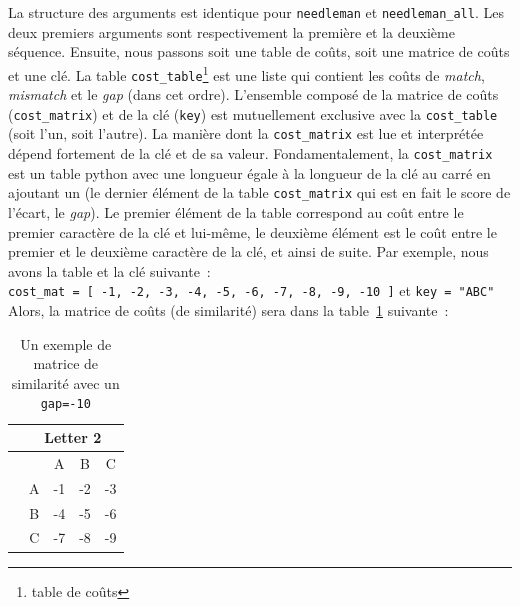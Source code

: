\documentclass[12pt]{article}
\def\rot#1{\rotatebox{90}{#1}}
\begin{document}
La structure des arguments est identique pour \texttt{needleman} et \texttt{needleman\_all}. Les deux premiers arguments sont respectivement la première et la deuxième séquence. Ensuite, nous passons soit une table de coûts, soit une matrice de coûts et une clé. La table \texttt{cost\_table}\footnote{table de coûts} est une liste qui contient les coûts de \textit{match}, \textit{mismatch} et le \textit{gap} (dans cet ordre). L'ensemble composé de la matrice de coûts (\texttt{cost\_matrix}) et de la clé (\texttt{key}) est mutuellement exclusive avec la \texttt{cost\_table} (soit l'un, soit l'autre). La manière dont la \texttt{cost\_matrix} est lue et interprétée dépend fortement de la clé et de sa valeur. Fondamentalement, la \texttt{cost\_matrix} est un table python avec une longueur égale à la longueur de la clé au carré en ajoutant un (le dernier élément de la table \texttt{cost\_matrix} qui est en fait le score de l'écart, le \textit{gap}). Le premier élément de la table correspond au coût entre le premier caractère de la clé et lui-même, le deuxième élément est le coût entre le premier et le deuxième caractère de la clé, et ainsi de suite. Par exemple, nous avons la table et la clé suivante~:\\ \texttt{cost\_mat = [  -1, -2, -3, -4, -5, -6, -7, -8, -9, -10  ]} 
et \texttt{key = "ABC"}\\
Alors, la matrice de coûts (de similarité) sera dans la table~\ref{tab:matcout} suivante~:\\
\begin{table}[!h]
    \centering
    \begin{tabular}{|l|c|c|c|c|}
        \hline
         & \multicolumn{4}{|c|}{Letter 2} \\
        \hline
         &   & A & B & C  \\ \cline{2-5}
         & A & -1 & -2 & -3 \\ \cline{2-5}
         & B & -4 & -5 & -6 \\ \cline{2-5}
        \rot{\rlap{~Letter 1}} & C & -7 & -8 & -9 \\ 
        \hline
    \end{tabular}
    \caption{Un exemple de matrice de similarité avec un \texttt{gap=-10}}
    \label{tab:matcout}
\end{table}
\end{document}
